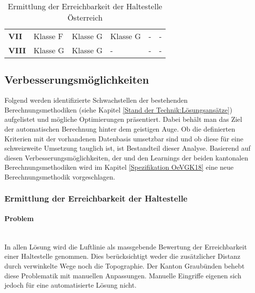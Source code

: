 \begin{table}[ht]
\begin{tabular}[c]{l p{2.0cm} p{2.0cm} p{2.0cm} p{2.0cm} p{2.0cm}}
        \cellcolor{red!25}\textbf{VII}
                                & \cellcolor{red!25}Klasse F
                                & \cellcolor{red!25}Klasse G
                                & \cellcolor{red!25}Klasse G
                                & -
                                & -\\
        \cellcolor{red!25}\textbf{VIII}
                                & \cellcolor{red!25}Klasse G
                                & \cellcolor{red!25}Klasse G
                                & -
                                & -
                                & -\\                          
        \bottomrule
    \end{tabular}
    \caption{Ermittlung der Erreichbarkeit der Haltestelle Österreich}
    \label{table:Ermittlung Erreichbarkeit der Haltestelle Österreich}
\end{table}

\subsection{Verbesserungsmöglichkeiten}
\label{Stand der Technik:Verbesserungsmöglichkeiten und Zusammenhang zu bestehenden Lösungen}

Folgend werden identifizierte Schwachstellen der bestehenden Berechnungsmethodiken (siehe Kapitel \ref{Stand der Technik:Lösungsansätze}) aufgelistet und mögliche Optimierungen präsentiert.
Dabei behält man das Ziel der automatischen Berechnung hinter dem geistigen Auge.
Ob die definierten Kriterien mit der vorhandenen Datenbasis umsetzbar sind und ob diese für eine schweizweite Umsetzung tauglich ist, ist Bestandteil dieser Analyse.
Basierend auf diesen Verbesserungsmöglichkeiten, der  und den Learnings der beiden kantonalen Berechnungsmethodiken wird im Kapitel \ref{Spezifikation OeVGK18} eine neue Berechnungsmethodik vorgeschlagen.

\subsubsection{Ermittlung der Erreichbarkeit der Haltestelle}
\label{Verbesserungsmöglichkeiten:Ermittlung der Erreichbarkeit der Haltestelle}

\paragraph{Problem}~\\
In allen Lösung wird die Luftlinie als massgebende Bewertung der Erreichbarkeit einer Haltestelle genommen.
Dies berücksichtigt weder die zusätzlicher Distanz durch verwinkelte Wege noch die Topographie.
Der Kanton Graubünden behebt diese Problematik mit manuellen Anpassungen.
Manuelle Eingriffe eigenen sich jedoch für eine automatisierte Lösung nicht.

